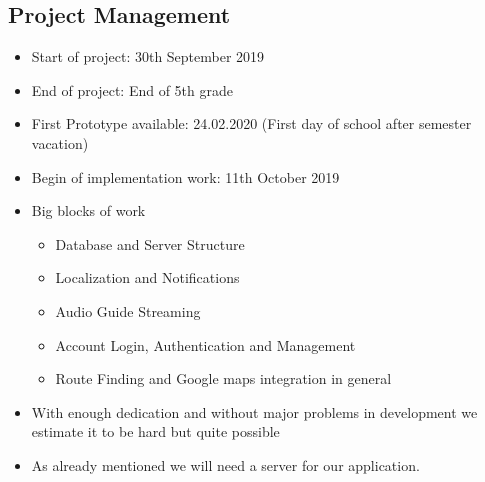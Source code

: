 \documentclass[12pt]{article}
\theoremstyle{definition}
\begin{document}
\subsection{Project Management}
\begin{itemize}
    \item Start of project: 30th September 2019
    \item End of project: End of 5th grade
    \newline
    \item First Prototype available: 24.02.2020 (First day of school after semester vacation)
    \item Begin of implementation work: 11th October 2019
    \newline
    \newline
    \item Big blocks of work
    \begin{itemize}
        \item Database and Server Structure
        \item Localization and Notifications
        \item Audio Guide Streaming
        \item Account Login, Authentication and Management
        \item Route Finding and Google maps integration in general
    \end{itemize}
    \item With enough dedication and without major problems in development we estimate it to be hard but quite possible
    \item As already mentioned we will need a server for our application.
    
\end{itemize} 
\end{document}
